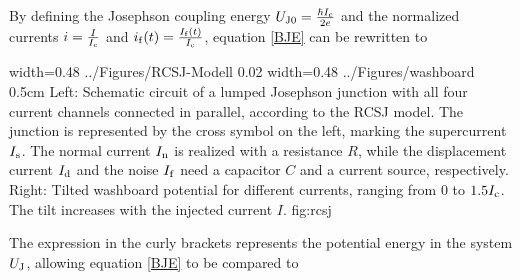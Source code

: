 
By defining the Josephson coupling energy $U_{\rm J0}=\frac{\hbar I_{\rm c}}{2e}$ and the normalized currents $i=\frac{I}{I_{\rm c}}$ and $i_{\rm f}(t)=\frac{I_{\rm f}(t)}{I_{\rm c}}$, equation \ref{BJE} can be rewritten to 


{width=0.48\textwidth}
{../Figures/RCSJ-Modell}
{0.02\textwidth} %
{width=0.48\textwidth}
{../Figures/washboard}
{0.5cm} %
{Left: Schematic circuit of a lumped Josephson junction with all four current channels connected in parallel, according to the RCSJ model. The junction is represented by the cross symbol on the left, marking the supercurrent $I_{\rm s}$. The normal current $I_{\rm n}$ is realized with a resistance $R$, while the displacement current $I_{\rm d}$ and the noise $I_{\rm f}$ need a capacitor $C$ and a current source, respectively. Right: Tilted washboard potential for different currents, ranging from 0 to $1.5I_{\rm c}$. The tilt increases with the injected current $I$.}
{fig:rcsj}

The expression in the curly brackets represents the potential energy in the system $U_{\rm J}$, allowing equation \ref{BJE} to be compared to 


